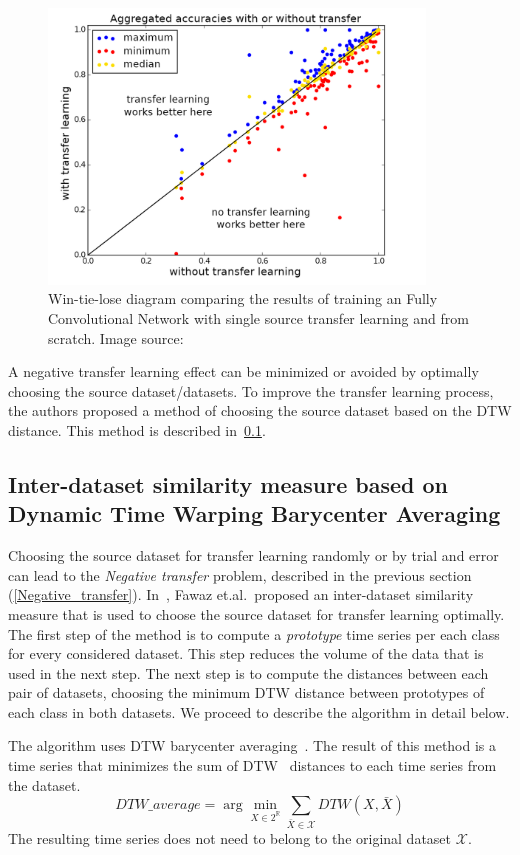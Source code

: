 \documentclass[a4paper,11pt,twoside]{report}
\theoremstyle{definition}
\DeclareMathOperator{\real}{\mathbb{R}}
\begin{document}
\begin{figure}[h!]
\centering
\includegraphics[width=10cm]{imgs/max_min_transfer_learning.png}
\caption{Win-tie-lose diagram comparing the results of training an Fully Convolutional Network with single source transfer learning and from scratch. Image source:~\cite{transfer_learning_time_series}}
\label{fig:tr_learning_min_max}
\end{figure}
\FloatBarrier
A negative transfer learning effect can be minimized or avoided by optimally choosing the source dataset/datasets. To improve the transfer learning process, the authors proposed a method of choosing the source dataset based on the DTW distance. This method is described in~\ref{DTW_choosing}.

\subsection{Inter-dataset similarity measure based on Dynamic Time Warping Barycenter Averaging} \label{DTW_choosing}
Choosing the source dataset for transfer learning randomly or by trial and error can lead to the \textit{Negative transfer} problem, described in the previous section (\ref{Negative_transfer}). In~\cite{transfer_learning_time_series}, Fawaz et.al.~proposed an inter-dataset similarity measure that is used to choose the source dataset for transfer learning optimally. The first step of the method is to compute a \textit{prototype} time series per each class for every considered dataset. This step reduces the volume of the data that is used in the next step. The next step is to compute the distances between each pair of datasets, choosing the minimum DTW distance between prototypes of each class in both datasets. We proceed to describe the algorithm in detail below.

The algorithm uses DTW barycenter averaging~\cite{dtw_dba}. The result of this method is a time series that minimizes the sum of DTW~\cite{dtw} distances to each time series from the dataset.
$$DTW\_average = \arg\min_{X \in  2^{\real}}  \sum_{\bar{X}\in \mathcal{X}} DTW(X, \bar{X})$$
The resulting time series does not need to belong to the original dataset $\mathcal{X}$.
\end{document}
